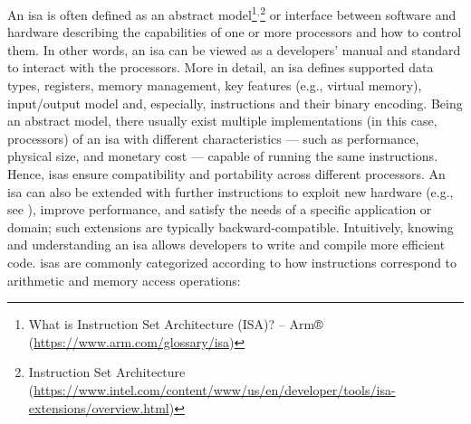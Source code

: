 An \gls{isa} is often defined as an abstract model\footnote{What is Instruction Set Architecture (ISA)? – Arm® (\url{https://www.arm.com/glossary/isa})}$^,$\footnote{Instruction Set Architecture (\url{https://www.intel.com/content/www/us/en/developer/tools/isa-extensions/overview.html})} or interface between software and hardware describing the capabilities of one or more processors and how to control them. In other words, an \gls{isa} can be viewed as a developers' manual and standard to interact with the processors. More in detail, an \gls{isa} defines supported data types, registers, memory management, key features (e.g., virtual memory), input/output model and, especially, instructions and their binary encoding. Being an abstract model, there usually exist multiple implementations (in this case, processors) of an \gls{isa} with different characteristics --- such as performance, physical size, and monetary cost --- capable of running the same instructions. Hence, \glspl{isa} ensure compatibility and portability across different processors. An \gls{isa} can also be extended with further instructions to exploit new hardware (e.g., see ), improve performance, and satisfy the needs of a specific application or domain; such extensions are typically backward-compatible. Intuitively, knowing and understanding an \gls{isa} allows developers to write and compile more efficient code. \glspl{isa} are commonly categorized according to how instructions correspond to arithmetic and memory access operations:

